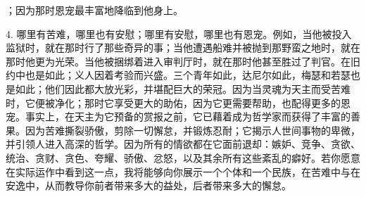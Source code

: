 ；因为那时恩宠最丰富地降临到他身上。\par

4. 哪里有苦难，哪里也有安慰；哪里有安慰，哪里也有恩宠。例如，当他被投入监狱时，就在那时行了那些奇异的事；当他遭遇船难并被抛到那野蛮之地时，就在那时他更为光荣。当他被捆绑着进入审判厅时，就在那时他甚至胜过了判官。在旧约中也是如此；义人因着考验而兴盛。三个青年如此，达尼尔如此，梅瑟和若瑟也是如此；他们因此都大放光彩，并堪配巨大的荣冠。因为当灵魂为天主而受苦难时，它便被净化；那时它享受更大的助佑，因为它更需要帮助，也配得更多的恩宠。事实上，在天主为它预备的赏报之前，它已藉着成为哲学家而获得了丰富的善果。因为苦难撕裂骄傲，剪除一切懈怠，并锻炼忍耐；它揭示人世间事物的卑微，并引领人进入高深的哲学。因为所有的情欲都在它面前退却：嫉妒、竞争、贪欲、统治、贪财、贪色、夸耀、骄傲、忿怒，以及其余所有这些紊乱的癖好。若你愿意在实际运作中看到这一点，我将能够向你展示一个个体和一个民族，在苦难中与在安逸中，从而教导你前者带来多大的益处，后者带来多大的懈怠。\par

